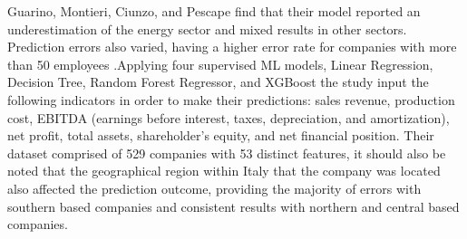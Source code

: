 \documentclass[12pt]{article}
\begin{document}
        Guarino, Montieri, Ciunzo, and Pescape find that their model reported an underestimation of the energy sector and mixed results in other sectors. Prediction errors also varied, having a higher error rate for companies with more than 50 employees \cite{Guarino10920689}.Applying four supervised ML models, Linear Regression, Decision Tree, Random Forest Regressor, and XGBoost the study input the following indicators in order to make their predictions: sales revenue, production cost, EBITDA (earnings before interest, taxes, depreciation, and amortization), net profit, total assets, shareholder's equity, and net financial position. Their dataset comprised of 529 companies with 53 distinct features, it should also be noted that the geographical region within Italy that the company was located also affected the prediction outcome, providing the majority of errors with southern based companies and consistent results with northern and central based companies.

\newpage


\end{document}
